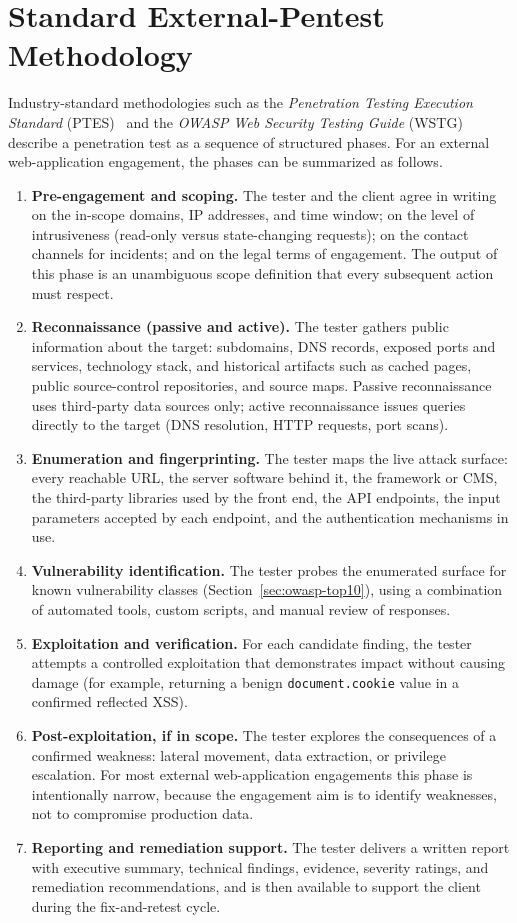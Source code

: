 \section{Standard External-Pentest Methodology}

Industry-standard methodologies such as the \textit{Penetration Testing Execution Standard} (PTES)~\cite{ptes} and the \textit{OWASP Web Security Testing Guide} (WSTG)~\cite{owasp_wstg} describe a penetration test as a sequence of structured phases. For an external web-application engagement, the phases can be summarized as follows.

\begin{enumerate}
  \item \textbf{Pre-engagement and scoping.} The tester and the client agree in writing on the in-scope domains, IP addresses, and time window; on the level of intrusiveness (read-only versus state-changing requests); on the contact channels for incidents; and on the legal terms of engagement. The output of this phase is an unambiguous scope definition that every subsequent action must respect.
  \item \textbf{Reconnaissance (passive and active).} The tester gathers public information about the target: subdomains, DNS records, exposed ports and services, technology stack, and historical artifacts such as cached pages, public source-control repositories, and source maps. Passive reconnaissance uses third-party data sources only; active reconnaissance issues queries directly to the target (DNS resolution, HTTP requests, port scans).
  \item \textbf{Enumeration and fingerprinting.} The tester maps the live attack surface: every reachable URL, the server software behind it, the framework or CMS, the third-party libraries used by the front end, the API endpoints, the input parameters accepted by each endpoint, and the authentication mechanisms in use.
  \item \textbf{Vulnerability identification.} The tester probes the enumerated surface for known vulnerability classes (Section~\ref{sec:owasp-top10}), using a combination of automated tools, custom scripts, and manual review of responses.
  \item \textbf{Exploitation and verification.} For each candidate finding, the tester attempts a controlled exploitation that demonstrates impact without causing damage (for example, returning a benign \texttt{document.cookie} value in a confirmed reflected XSS).
  \item \textbf{Post-exploitation, if in scope.} The tester explores the consequences of a confirmed weakness: lateral movement, data extraction, or privilege escalation. For most external web-application engagements this phase is intentionally narrow, because the engagement aim is to identify weaknesses, not to compromise production data.
  \item \textbf{Reporting and remediation support.} The tester delivers a written report with executive summary, technical findings, evidence, severity ratings, and remediation recommendations, and is then available to support the client during the fix-and-retest cycle.
\end{enumerate}

